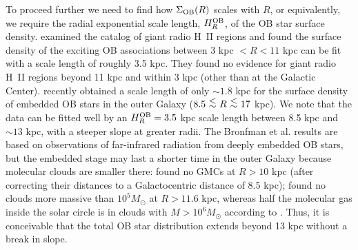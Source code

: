 \documentclass[12pt,preprint,flushrt]{aastex}
\newcommand{\al}{\mbox{ \raisebox{-.4ex}{$\stackrel{\textstyle <}{\sim}$} }}
\begin{document}
To proceed further we need to find how $\Sigma_{\rm OB}(R)$ scales with
$R$, or equivalently, we require the radial exponential scale length,
$H_R^{\rm OB}$, of the OB star surface density. \cite{mck97} examined the
\cite{smith78} catalog of giant radio H~II regions and found the surface
density of the exciting OB  associations
between 3 kpc $ < R < 11$ kpc
can be fit with a scale length of roughly 3.5 kpc. They found no evidence
for giant radio H~II regions beyond 11 kpc and within 3 kpc
(other than at the Galactic Center).
\cite{bron00} recently obtained
a scale length of only $\sim 1.8$ kpc for the surface density of
embedded OB stars in the outer Galaxy ($8.5 \al R  \al 17$ kpc). We note
that the \cite{bron00} data can be fitted well
by an $H_R^{\rm OB} = 3.5 $ kpc
scale length between 8.5 kpc and $\sim 13$ kpc, with a steeper slope
at greater radii.
The Bronfman et al. results are based on observations of far-infrared
radiation from deeply embedded OB stars, but the embedded stage
may last a shorter time in the outer Galaxy because molecular
clouds are smaller there: \cite{sol87} found no
GMCs at $R>10$ kpc (after correcting their distances to
a Galactocentric distance of 8.5 kpc); \cite{hey01} found no
clouds more massive than $10^5 M_\odot$ at $R>11.6$ kpc, whereas
half the molecular gas inside the solar circle is in clouds
with $M> 10^6 M_\odot$ according to \cite{wil97}.
Thus, it is conceivable that the total OB star distribution extends beyond
13 kpc without a break in slope.
\end{document}
